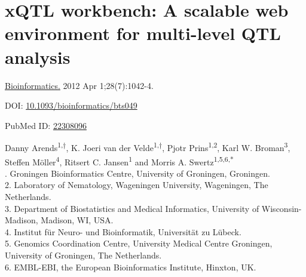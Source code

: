 \chapter[A scalable web environment for multi-level QTL analysis]{xQTL workbench: A scalable web environment for multi-level QTL analysis}
\label{chap:xqtl}

{ \Large {} }

\hfill \underline{Bioinformatics.} 2012 Apr 1;28(7):1042-4.

\hfill DOI: \href{https://doi.org/10.1093/bioinformatics/bts049}{10.1093/bioinformatics/bts049}

\hfill PubMed ID: \href{https://www.ncbi.nlm.nih.gov/pubmed/22308096}{22308096}

\newpage

\noindent
Danny Arends\textsuperscript{1,†}, K. Joeri van der Velde\textsuperscript{1,†}, Pjotr Prins\textsuperscript{1,2}, Karl W. Broman\textsuperscript{3}, Steffen Möller\textsuperscript{4}, Ritsert C. Jansen\textsuperscript{1} and Morris A. Swertz\textsuperscript{1,5,6,*}\\

. Groningen Bioinformatics Centre, University of Groningen, Groningen.\\
2. Laboratory of Nematology, Wageningen University, Wageningen, The Netherlands.\\
3. Department of Biostatistics and Medical Informatics, University of Wisconsin-Madison, Madison, WI, USA.\\
4. Institut für Neuro- und Bioinformatik, Universität zu Lübeck.\\
5. Genomics Coordination Centre, University Medical Centre Groningen, University of Groningen, The Netherlands.\\
6. EMBL-EBI, the European Bioinformatics Institute, Hinxton, UK.\\

